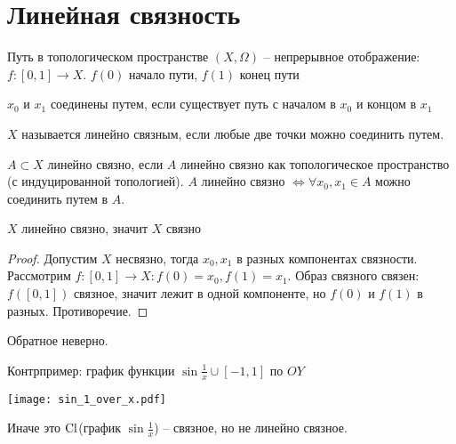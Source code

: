 \documentclass[main]{subfiles}
\begin{document}
\section{Линейная связность}
\begin{definition}
    Путь в топологическом пространстве $(X, \Omega)$ -- непрерывное отображение:
    $f: [0,1] \to X$. $f(0)$ начало пути, $f(1)$ конец пути
\end{definition}
\begin{definition}
    $x_0$ и $x_1$ соединены путем, если существует путь с началом в $x_0$ и концом в $x_1$
\end{definition}
\begin{definition}
    $X$ называется линейно связным, если любые две точки можно соединить путем.

    $A \subset X$ линейно связно, если $A$ линейно связно как топологическое пространство (с индуцированной топологией).
    $A$ линейно связно $\Leftrightarrow \forall x_0, x_1 \in A$ можно соединить путем в $A$.
\end{definition}
\begin{theorem}
    $X$ линейно связно, значит $X$ связно
\end{theorem}
\begin{proof}
    Допустим $X$ несвязно, тогда $x_0, x_1$ в разных компонентах связности.
    Рассмотрим $f: [0, 1] \to X: f(0) = x_0, f(1) = x_1$.
    Образ связного связен: $f([0, 1])$ связное,
    значит лежит в одной компоненте, но $f(0)$ и $f(1)$ в разных. Противоречие.
\end{proof}
\begin{remark}
    Обратное неверно.
\end{remark}
\begin{example}
    Контрпример: график функции $\sin \frac{1}{x} \cup [-1, 1]$ по $OY$
    \begin{center}
        \texttt{[image: sin\_1\_over\_x.pdf]}
    \end{center}
    Иначе это $\operatorname{Cl}$(график $\sin \frac{1}{x}$) -- связное, но не линейно связное.
\end{example}
\end{document}
